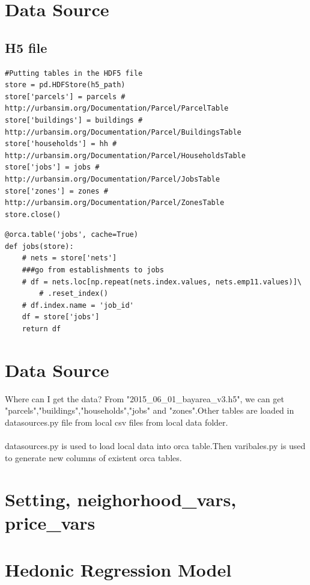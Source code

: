 \documentclass{article}\usepackage[]{graphicx}\usepackage[]{color}
\begin{document}
\section{Data Source}
\subsection{H5 file}


\begin{lstlisting}
#Putting tables in the HDF5 file
store = pd.HDFStore(h5_path)
store['parcels'] = parcels # http://urbansim.org/Documentation/Parcel/ParcelTable
store['buildings'] = buildings # http://urbansim.org/Documentation/Parcel/BuildingsTable
store['households'] = hh # http://urbansim.org/Documentation/Parcel/HouseholdsTable
store['jobs'] = jobs # http://urbansim.org/Documentation/Parcel/JobsTable
store['zones'] = zones # http://urbansim.org/Documentation/Parcel/ZonesTable
store.close()
\end{lstlisting}


\begin{lstlisting}
@orca.table('jobs', cache=True)
def jobs(store):
    # nets = store['nets']
    ###go from establishments to jobs
    # df = nets.loc[np.repeat(nets.index.values, nets.emp11.values)]\
        # .reset_index()
    # df.index.name = 'job_id'
    df = store['jobs']
    return df
\end{lstlisting}





\section{Data Source}
Where can I get the data?
From "2015\_06\_01\_bayarea\_v3.h5", we can get "parcels","buildings","households","jobs" and "zones".Other tables are loaded in datasources.py file from local csv files from local data folder.\\
\\
datasources.py is used to load local data into orca table.Then varibales.py is used to generate new columns of existent orca tables.\\

\section{Setting, neighorhood\_vars, price\_vars}


\section{Hedonic Regression Model}
\end{document}
